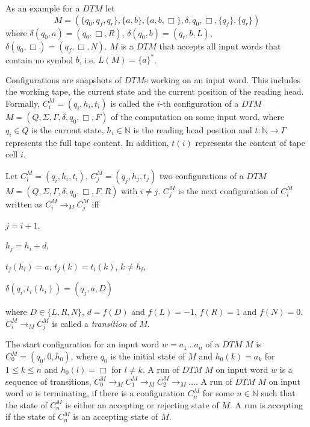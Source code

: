 \begin{example}
    \label{example:dtm}
    As an example for a $\mathit{DTM}$ let
    \[M = (\{q_0, q_f, q_r\}, \{a, b\}, \{a, b, \Box\}, \delta, q_0, \Box, \{q_f\}, \{q_r\})\]
    where $\delta(q_0, a)= (q_0, \Box, R)$, $\delta(q_0, b) = (q_r, b, L)$, $\delta(q_0, \Box) = (q_f, \Box, N)$.
    $M$ is a $\mathit{DTM}$ that accepts all input words that contain no symbol $b$, i.e. $L(M) = \{a\}^*$.
\end{example}

Configurations are snapshots of $\mathit{DTM}$s working on an input word. This includes the working tape, the current
state and the current position of the reading head. Formally, $C_i^M = (q_i, h_i, t_i)$ is called the $i$-th
configuration of a $\mathit{DTM}$ $M = (Q, \Sigma, \Gamma, \delta, q_0, \Box, F)$ of the computation on some input
word, where $q_i \in Q$ is the current state, $h_i \in \mathbb{N}$ is the reading head position and $t: \mathbb{N}
\rightarrow \Gamma$ represents the full tape content. In addition, $t(i)$ represents the content of tape cell $i$.

\begin{definition}
    Let $C_i^M = (q_i, h_i, t_i)$, $C_j^M = (q_j, h_j, t_j)$ two configurations of a
    $\mathit{DTM}$ $M = (Q, \Sigma, \Gamma, \delta, q_0, \Box, F, R)$ with $i \neq j$. $C_j^M$ is the next configuration
    of $C_i^M$ written as $C_i^M \rightarrow_M C_j^M$ iff
    \begin{compactitem}
        \item $j = i + 1$,

        \item $h_j = h_i + d$,

        \item $t_j(h_i) = a$, $t_j(k) = t_i(k)$, $k \neq h_i$,

        \item $\delta(q_i, t_i(h_i)) = (q_j, a, D)$
    \end{compactitem}
    where $D \in \{L, R, N\}$, $d = f(D)$ and $f(L) = -1$, $f(R) = 1$ and $f(N) = 0$. $C_i^M \rightarrow_M C_j^M$ is
    called a \emph{transition} of $M$.
\end{definition}

The start configuration for an input word $w = a_1\dots a_n$ of a $\mathit{DTM}$ $M$ is $C_0^M = (q_0, 0, h_{0})$,
where $q_0$ is the initial state of $M$ and $h_0(k) = a_k$ for $1 \leq k \leq n$ and $h_0(l) = \Box$ for $l \neq k$. A
run of $\mathit{DTM}$ $M$ on input word $w$ is a sequence of transitions, $C_0^M \rightarrow_M C_1^M \rightarrow_M
C_2^M \rightarrow_M \dots$. A run of $\mathit{DTM}$ $M$ on input word $w$ is terminating, if there is a
configuration $C_n^M$ for some $n \in \mathbb{N}$ such that the state of $C_n^M$ is either an accepting or rejecting
state of $M$. A run is accepting if the state of $C_n^M$ is an accepting state of $M$.


